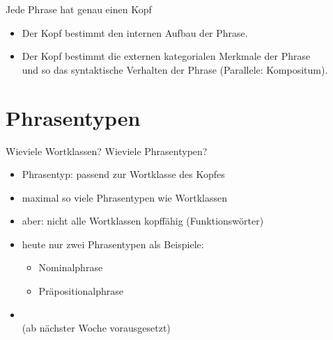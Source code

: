 \begin{frame}
  {Jede Phrase hat genau einen Kopf}
  \pause
  \pause
  \Halbzeile
  \begin{itemize}[<+->]
    \item Der Kopf bestimmt den \alert{internen Aufbau} der Phrase.
    \item Der Kopf bestimmt die \alert{externen kategorialen Merkmale} der Phrase\\
      und so das syntaktische Verhalten der Phrase (Parallele: \alert{Kompositum}).
  \end{itemize}
\end{frame}


\section{Phrasentypen}

\begin{frame}
  {Wieviele Wortklassen? Wieviele Phrasentypen?}
  \pause
  \begin{itemize}[<+->]
    \item \alert{Phrasentyp: passend zur Wortklasse des Kopfes}
    \item maximal so viele Phrasentypen wie Wortklassen
    \item aber: nicht alle Wortklassen kopffähig (\alert{Funktionswörter})
      \Zeile
    \item heute nur zwei Phrasentypen als Beispiele:
      \begin{itemize}[<+->]
        \item Nominalphrase
        \item Präpositionalphrase
      \end{itemize}
    \item {}\\
      (ab nächster Woche vorausgesetzt)
  \end{itemize}
\end{frame}



